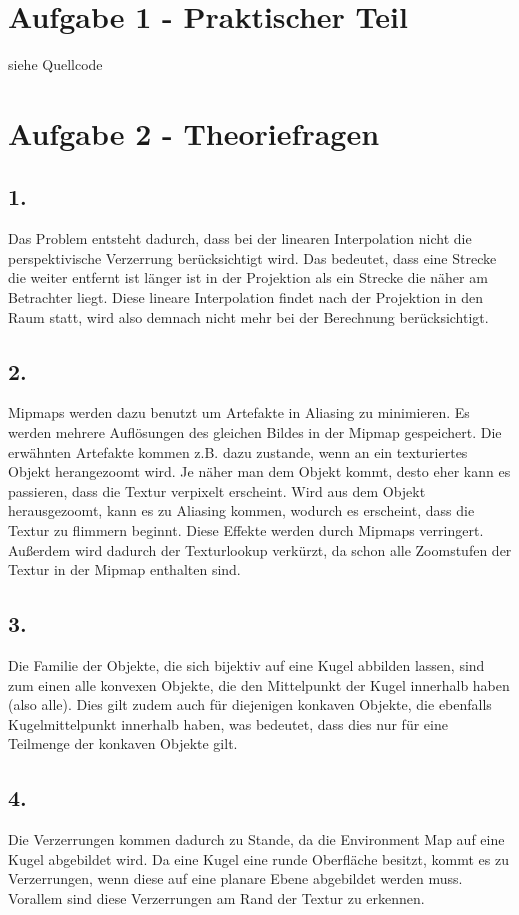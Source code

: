 \documentclass[12pt]{scrreprt}
\begin{document}


\chapter*{Aufgabe 1 - Praktischer Teil}

siehe Quellcode

\chapter*{Aufgabe 2 - Theoriefragen}
\section*{1.}
Das Problem entsteht dadurch, dass bei der linearen Interpolation nicht die perspektivische Verzerrung berücksichtigt wird. Das bedeutet, dass eine Strecke die weiter entfernt ist länger ist in der Projektion als ein Strecke die näher am Betrachter liegt. 
Diese lineare Interpolation findet nach der Projektion in den Raum statt, wird also demnach nicht mehr bei der Berechnung berücksichtigt.
\section*{2.}
Mipmaps werden dazu benutzt um Artefakte in Aliasing zu minimieren. Es werden mehrere Auflösungen des gleichen Bildes in der Mipmap gespeichert. Die erwähnten Artefakte kommen z.B. dazu zustande, wenn an ein texturiertes Objekt herangezoomt wird. Je näher man dem Objekt kommt, desto eher kann es passieren, dass die Textur verpixelt erscheint. Wird aus dem Objekt herausgezoomt, kann es zu Aliasing kommen, wodurch es erscheint, dass die Textur zu flimmern beginnt. Diese Effekte werden durch Mipmaps verringert. Außerdem wird dadurch der Texturlookup verkürzt, da schon alle Zoomstufen der Textur in der Mipmap enthalten sind.
\section*{3.}
Die Familie der Objekte, die sich bijektiv auf eine Kugel abbilden lassen, sind zum einen alle konvexen Objekte, die den Mittelpunkt der Kugel innerhalb haben (also alle). Dies gilt zudem auch für diejenigen konkaven Objekte, die ebenfalls Kugelmittelpunkt innerhalb haben, was bedeutet, dass dies nur für eine Teilmenge der konkaven Objekte gilt.
\section*{4.}
Die Verzerrungen kommen dadurch zu Stande, da die Environment Map auf eine Kugel abgebildet wird. Da eine Kugel eine runde Oberfläche besitzt, kommt es zu Verzerrungen, wenn diese auf eine planare Ebene abgebildet werden muss. Vorallem sind diese Verzerrungen am Rand der Textur zu erkennen.
\end{document}
